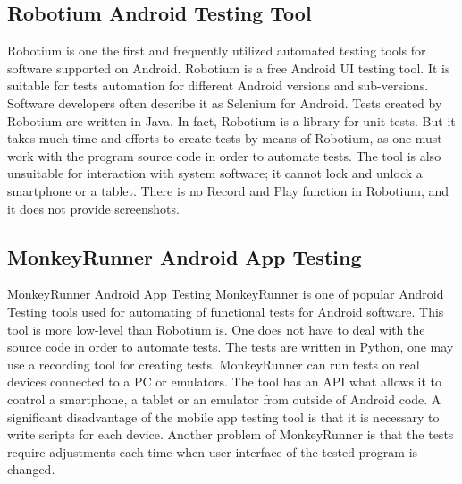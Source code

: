 \subsection{Robotium Android Testing Tool}
Robotium is one the first and frequently utilized automated testing tools for software supported on Android. Robotium is a free Android UI testing tool. It is suitable for tests automation for different Android versions and sub-versions. Software developers often describe it as Selenium for Android. Tests created by Robotium are written in Java. In fact, Robotium is a library for unit tests.
But it takes much time and efforts to create tests by means of Robotium, as one must work with the program source code in order to automate tests. The tool is also unsuitable for interaction with system software; it cannot lock and unlock a smartphone or a tablet. There is no Record and Play function in Robotium, and it does not provide screenshots.
\subsection{MonkeyRunner Android App Testing}
MonkeyRunner Android App Testing
MonkeyRunner is one of popular Android Testing tools used for automating of functional tests for Android software. This tool is more low-level than Robotium is. One does not have to deal with the source code in order to automate tests. The tests are written in Python, one may use a recording tool for creating tests.
MonkeyRunner can run tests on real devices connected to a PC or emulators. The tool has an API what allows it to control a smartphone, a tablet or an emulator from outside of Android code. A significant disadvantage of the mobile app testing tool is that it is necessary to write scripts for each device. Another problem of MonkeyRunner is that the tests require adjustments each time when user interface of the tested program is changed.